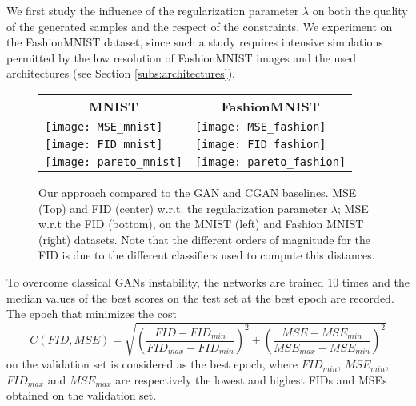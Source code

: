 We first study the influence of the  regularization parameter $\lambda$ on both the quality of the generated samples and the respect of the constraints. We experiment on the %
FashionMNIST \citep{Xiao2017} dataset, since such a study requires intensive simulations permitted by the low resolution of FashionMNIST images and the used architectures (see Section \ref{subs:architectures}). 

\begin{figure}[!h]
	\begin{tabular}{ll} 
		\multicolumn{1}{c}{\hspace{-20px}\textbf{MNIST}} & \multicolumn{1}{c}{\hspace{-20px}\textbf{FashionMNIST} \hspace{20px}}\\
		\texttt{[image: MSE\_mnist]}				 & \texttt{[image: MSE\_fashion]} \\
		\texttt{[image: FID\_mnist]}				 & \texttt{[image: FID\_fashion]} \\
		\texttt{[image: pareto\_mnist]} & \texttt{[image: pareto\_fashion]} \\
	\end{tabular}
	\caption[Hyperparameter study for our approach and GAN/CGAN on two datasets]{Our approach compared to the GAN and CGAN baselines. MSE (Top) and  FID (center) w.r.t. the regularization parameter $\lambda$; MSE w.r.t the FID (bottom), on the MNIST (left) and Fashion MNIST (right) datasets. Note  that the different orders of magnitude for the FID is due to the different classifiers used to compute this distances.
	}
	\label{fig:fids}
	\label{fig:mses}
	\label{fig:paretos}
\end{figure}

To overcome classical GANs instability, the networks are trained 10 times and the median values of the best scores on the test set at the best epoch 
are recorded. The epoch that minimizes the cost
\begin{equation*}
C(FID, MSE) = \sqrt{\left(\frac{FID - FID_{min}}{FID_{max}- FID_{min}}\right)^2 + \left(\frac{MSE - MSE_{min}}{MSE_{max}- MSE_{min}}\right)^2}
\end{equation*}  on the validation set is considered as the best epoch, where $FID_{min}$, $MSE_{min}$, $FID_{max}$ and $MSE_{max}$ are respectively the lowest and highest \ac{FID}s and \ac{MSE}s obtained on the validation set.

